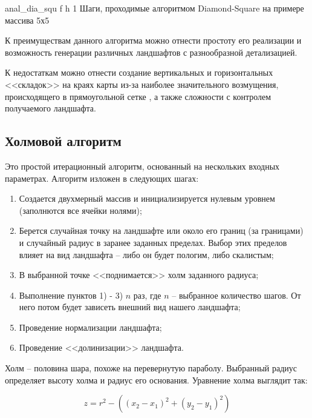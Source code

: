 {anal_dia_squ} %
{f} %
{h} %
{1\textwidth} %
{Шаги, проходимые алгоритмом Diamond-Square на примере массива 5х5} %

К преимуществам данного алгоритма можно отнести простоту его реализации и возможность генерации различных ландшафтов с разнообразной детализацией.

К недостаткам можно отнести создание вертикальных и горизонтальных <<складок>> на краях карты из-за наиболее значительного возмущения, происходящего в прямоугольной сетке \cite{diasquwiki}, а также сложности с контролем получаемого ландшафта.

\subsection{Холмовой алгоритм}

Это простой итерационный алгоритм, основанный на нескольких входных параметрах. Алгоритм изложен в следующих шагах:

\begin{enumerate}[label={\arabic*)}]
	\item Создается двухмерный массив и инициализируется нулевым уровнем (заполнются все ячейки нолями);
	\item Берется случайная точку на ландшафте или около его границ (за границами) и случайный радиус в заранее заданных пределах. Выбор этих пределов влияет на вид ландшафта -- либо он будет пологим, либо скалистым; 
	\item В выбранной точке <<поднимается>> холм заданного радиуса;
	\item Выполнение пунктов 1) - 3) $n$ раз, где $n$ -- выбранное количество шагов. От него потом будет зависеть внешний вид нашего ландшафта;
	\item Проведение нормализации ландшафта;
	\item Проведение <<долинизации>> ландшафта.
\end{enumerate}

Холм – половина шара, похоже на перевернутую параболу. Выбранный радиус определяет высоту холма и радиус его основания. Уравнение холма выглядит так: 

\begin{equation}
	\label{equ:hill}
	z = r^2 - ((x_2 - x_1)^2 + (y_2 - y_1)^2)
\end{equation}

